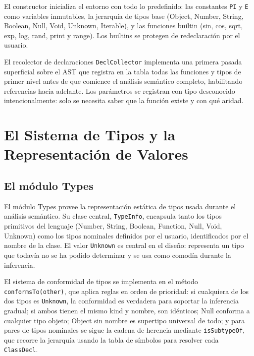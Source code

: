 \documentclass[11pt,a4paper]{article}
\begin{document}
El constructor inicializa el entorno con todo lo predefinido: las constantes \texttt{PI} y \texttt{E} como variables inmutables, la jerarquía de tipos base (Object, Number, String, Boolean, Null, Void, Unknown, Iterable), y las funciones builtin (sin, cos, sqrt, exp, log, rand, print y range). Los builtins se protegen de redeclaración por el usuario.

El recolector de declaraciones \texttt{DeclCollector} implementa una primera pasada superficial sobre el AST que registra en la tabla todas las funciones y tipos de primer nivel antes de que comience el análisis semántico completo, habilitando referencias hacia adelante. Los parámetros se registran con tipo desconocido intencionalmente: solo se necesita saber que la función existe y con qué aridad.

\section{El Sistema de Tipos y la Representación de Valores}

\subsection{El módulo Types}

El módulo Types provee la representación estática de tipos usada durante el análisis semántico. Su clase central, \texttt{TypeInfo}, encapsula tanto los tipos primitivos del lenguaje (Number, String, Boolean, Function, Null, Void, Unknown) como los tipos nominales definidos por el usuario, identificados por el nombre de la clase. El valor \texttt{Unknown} es central en el diseño: representa un tipo que todavía no se ha podido determinar y se usa como comodín durante la inferencia.

El sistema de conformidad de tipos se implementa en el método \texttt{conformsTo(other)}, que aplica reglas en orden de prioridad: si cualquiera de los dos tipos es \texttt{Unknown}, la conformidad es verdadera para soportar la inferencia gradual; si ambos tienen el mismo kind y nombre, son idénticos; Null conforma a cualquier tipo objeto; Object sin nombre es supertipo universal de todo; y para pares de tipos nominales se sigue la cadena de herencia mediante \texttt{isSubtypeOf}, que recorre la jerarquía usando la tabla de símbolos para resolver cada \texttt{ClassDecl}.
\end{document}
